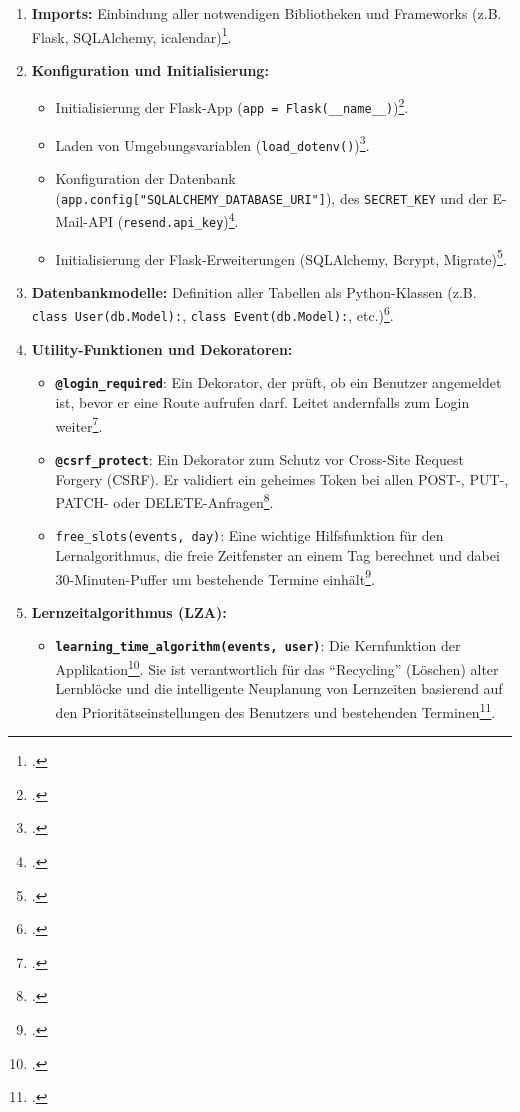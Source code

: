 \documentclass[12pt,a4paper]{report}
\begin{document}
\begin{enumerate}
    \item \textbf{Imports:} Einbindung aller notwendigen Bibliotheken und Frameworks (z.B. Flask, SQLAlchemy, icalendar)\footcite{app.py}.
    \item \textbf{Konfiguration und Initialisierung:}
    \begin{itemize}
        \item Initialisierung der Flask-App (\texttt{app = Flask(\_\_name\_\_)})\footcite{app.py}.
        \item Laden von Umgebungsvariablen (\texttt{load\_dotenv()})\footcite{app.py}.
        \item Konfiguration der Datenbank (\texttt{app.config["SQLALCHEMY\_DATABASE\_URI"]}), des \texttt{SECRET\_KEY} und der E-Mail-API (\texttt{resend.api\_key})\footcite{app.py}.
        \item Initialisierung der Flask-Erweiterungen (SQLAlchemy, Bcrypt, Migrate)\footcite{app.py}.
    \end{itemize}
    \item \textbf{Datenbankmodelle:} Definition aller Tabellen als Python-Klassen (z.B. \texttt{class User(db.Model):}, \texttt{class Event(db.Model):}, etc.)\footcite{app.py}.
    \item \textbf{Utility-Funktionen und Dekoratoren:}
    \begin{itemize}
        \item \textbf{\texttt{@login\_required}}: Ein Dekorator, der prüft, ob ein Benutzer angemeldet ist, bevor er eine Route aufrufen darf. Leitet andernfalls zum Login weiter\footcite{app.py}.
        \item \textbf{\texttt{@csrf\_protect}}: Ein Dekorator zum Schutz vor Cross-Site Request Forgery (CSRF). Er validiert ein geheimes Token bei allen POST-, PUT-, PATCH- oder DELETE-Anfragen\footcite{app.py, main.tex}.
        \item \texttt{free\_slots(events, day)}: Eine wichtige Hilfsfunktion für den Lernalgorithmus, die freie Zeitfenster an einem Tag berechnet und dabei 30-Minuten-Puffer um bestehende Termine einhält\footcite{app.py, main.tex}.
    \end{itemize}
    \item \textbf{Lernzeitalgorithmus (LZA):}
    \begin{itemize}
        \item \textbf{\texttt{learning\_time\_algorithm(events, user)}}: Die Kernfunktion der Applikation\footcite{app.py, main.tex}. Sie ist verantwortlich für das \enquote{Recycling} (Löschen) alter Lernblöcke und die intelligente Neuplanung von Lernzeiten basierend auf den Prioritätseinstellungen des Benutzers und bestehenden Terminen\footcite{app.py, main.tex}.

\end{itemize}
\end{enumerate}
\end{document}
